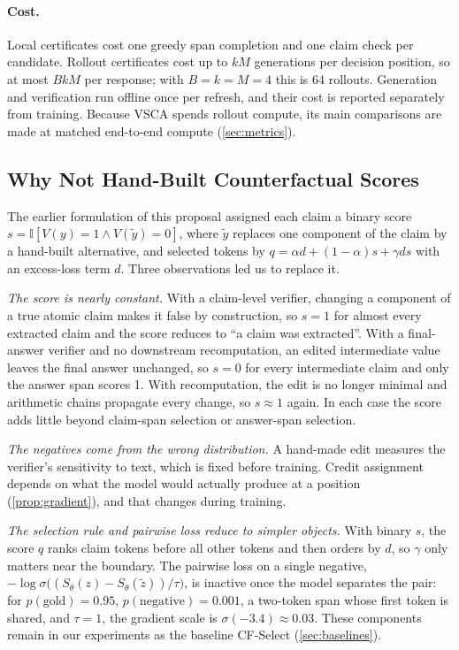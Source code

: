 \documentclass{article}
\newcommand{\vsca}{\textsc{VSCA}}
\newcommand{\ind}{\mathbb{I}}
\theoremstyle{plain}
\theoremstyle{remark}
\begin{document}
\paragraph{Cost.} Local certificates cost one greedy span completion and one claim check per candidate. Rollout certificates cost up to $kM$ generations per decision position, so at most $BkM$ per response; with $B=k=M=4$ this is 64 rollouts. Generation and verification run offline once per refresh, and their cost is reported separately from training. Because \vsca{} spends rollout compute, its main comparisons are made at matched end-to-end compute (\cref{sec:metrics}).

\subsection{Why Not Hand-Built Counterfactual Scores}
\label{sec:why-not}
The earlier formulation of this proposal assigned each claim a binary score $s=\ind[V(y)=1\wedge V(\tilde y)=0]$, where $\tilde y$ replaces one component of the claim by a hand-built alternative, and selected tokens by $q=\alpha d+(1-\alpha)s+\gamma ds$ with an excess-loss term $d$. Three observations led us to replace it.

\emph{The score is nearly constant.} With a claim-level verifier, changing a component of a true atomic claim makes it false by construction, so $s=1$ for almost every extracted claim and the score reduces to ``a claim was extracted''. With a final-answer verifier and no downstream recomputation, an edited intermediate value leaves the final answer unchanged, so $s=0$ for every intermediate claim and only the answer span scores 1. With recomputation, the edit is no longer minimal and arithmetic chains propagate every change, so $s\approx 1$ again. In each case the score adds little beyond claim-span selection or answer-span selection.

\emph{The negatives come from the wrong distribution.} A hand-made edit measures the verifier's sensitivity to text, which is fixed before training. Credit assignment depends on what the model would actually produce at a position (\cref{prop:gradient}), and that changes during training.

\emph{The selection rule and pairwise loss reduce to simpler objects.} With binary $s$, the score $q$ ranks claim tokens before all other tokens and then orders by $d$, so $\gamma$ only matters near the boundary. The pairwise loss on a single negative, $-\log\sigma\big((S_\theta(z)-S_\theta(\tilde z))/\tau\big)$, is inactive once the model separates the pair: for $p(\text{gold})=0.95$, $p(\text{negative})=0.001$, a two-token span whose first token is shared, and $\tau=1$, the gradient scale is $\sigma(-3.4)\approx 0.03$. These components remain in our experiments as the baseline CF-Select (\cref{sec:baselines}).
\end{document}
